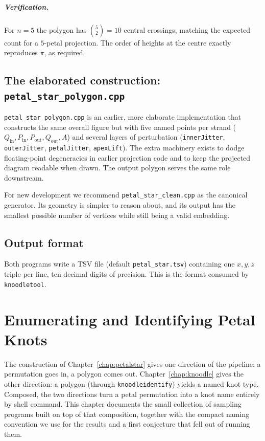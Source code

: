 \documentclass[11pt,oneside]{report}
\theoremstyle{definition}
\begin{document}
\paragraph{Verification.} For $n=5$ the polygon has $\binom{5}{2} = 10$ central
crossings, matching the expected count for a $5$-petal projection. The
order of heights at the centre exactly reproduces $\pi$, as required.

\section{The elaborated construction: \texttt{petal\_star\_polygon.cpp}}

\texttt{petal\_star\_polygon.cpp} is an earlier, more elaborate implementation
that constructs the same overall figure but with five named points per strand
($Q_{\mathrm{in}}, P_{\mathrm{in}}, P_{\mathrm{out}}, Q_{\mathrm{out}},
A$) and several layers of perturbation (\texttt{innerJitter},
\texttt{outerJitter}, \texttt{petalJitter}, \texttt{apexLift}). The extra
machinery exists to dodge floating-point degeneracies in earlier projection
code and to keep the projected diagram readable when drawn. The output
polygon serves the same role downstream.

For new development we recommend \texttt{petal\_star\_clean.cpp} as the
canonical generator. Its geometry is simpler to reason about, and its
output has the smallest possible number of vertices while still being a
valid embedding.

\section{Output format}

Both programs write a TSV file (default \texttt{petal\_star.tsv}) containing
one $x,y,z$ triple per line, ten decimal digits of precision. This is the
format consumed by \texttt{knoodletool}.

\chapter{Enumerating and Identifying Petal Knots}\label{chap:enum}

The construction of Chapter~\ref{chap:petalstar} gives one direction of the
pipeline: a permutation goes in, a polygon comes out. Chapter~\ref{chap:knoodle}
gives the other direction: a polygon (through \texttt{knoodleidentify}) yields
a named knot type. Composed, the two directions turn a petal permutation into
a knot name entirely by shell command. This chapter documents the small
collection of sampling programs built on top of that composition, together
with the compact naming convention we use for the results and a first
conjecture that fell out of running them.
\end{document}

